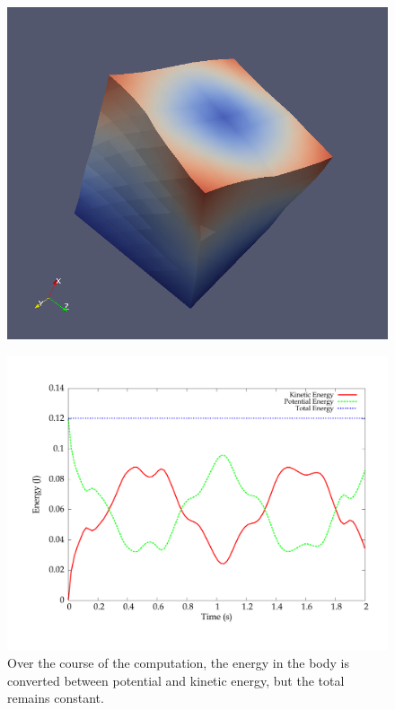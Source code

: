 \begin{figure}
{{              \includegraphics[width=\twofigsfull]{chapters/narayanan/images/png/release_500.png}
            }
}
\end{figure}

\begin{figure}
  \centering
  \includegraphics[width=\largefig]{chapters/narayanan/images/pdf/energies.pdf}
  \caption{Over the course of the computation, the energy in the body
    is converted between potential and kinetic energy, but the total
    remains constant.}
  \label{fig:narayanan:energies}
\end{figure}

